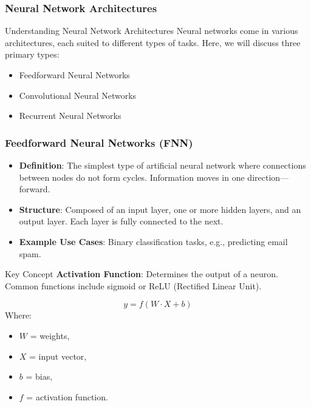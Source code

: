 \documentclass[aspectratio=169]{beamer}
\begin{document}
\begin{frame}[fragile]
    \frametitle{Neural Network Architectures}
    \begin{block}{Understanding Neural Network Architectures}
        Neural networks come in various architectures, each suited to different types of tasks. Here, we will discuss three primary types:
        \begin{itemize}
            \item Feedforward Neural Networks
            \item Convolutional Neural Networks
            \item Recurrent Neural Networks
        \end{itemize}
    \end{block}
\end{frame}

\begin{frame}[fragile]
    \frametitle{Feedforward Neural Networks (FNN)}
    \begin{itemize}
        \item \textbf{Definition}: The simplest type of artificial neural network where connections between nodes do not form cycles. Information moves in one direction—forward.
        \item \textbf{Structure}: Composed of an input layer, one or more hidden layers, and an output layer. Each layer is fully connected to the next.
        \item \textbf{Example Use Cases}: Binary classification tasks, e.g., predicting email spam.
    \end{itemize}

    \begin{block}{Key Concept}
        \textbf{Activation Function}: Determines the output of a neuron. Common functions include sigmoid or ReLU (Rectified Linear Unit).
    \end{block}

    \begin{equation}
        y = f(W \cdot X + b)
    \end{equation}
    Where: 
    \begin{itemize}
        \item \( W \) = weights,
        \item \( X \) = input vector,
        \item \( b \) = bias,
        \item \( f \) = activation function.
    \end{itemize}
\end{frame}
\end{document}
